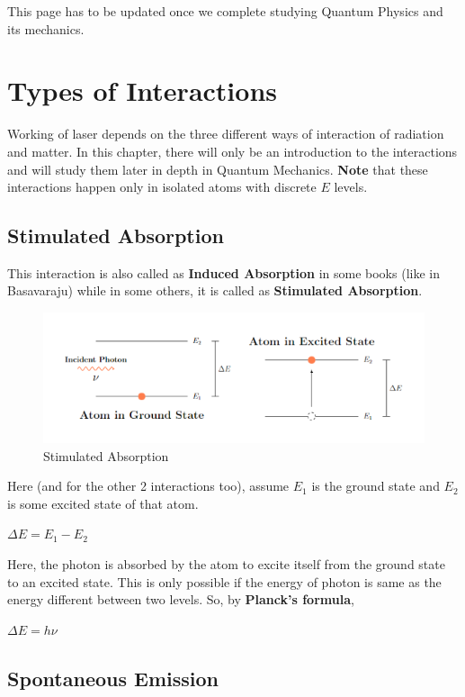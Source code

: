 \documentclass[12pt]{article}
\begin{document}
This page has to be updated once we complete studying Quantum Physics and its mechanics.

\section{Types of Interactions}

Working of laser depends on the three different ways of interaction of radiation and matter. In this chapter, there will only be an introduction to the interactions and will study them later in depth in Quantum Mechanics. \textbf{Note} that these interactions happen only in isolated atoms with discrete $E$ levels.

\subsection{Stimulated Absorption}

This interaction is also called as \textbf{Induced Absorption} in some books (like in Basavaraju) while in some others, it is called as \textbf{Stimulated Absorption}.

\begin{figure}[H]
    \centering
    \includegraphics[scale=0.5]{./img/03_induced_absorption.png}
    \caption{Stimulated Absorption}
\end{figure}

Here (and for the other 2 interactions too), assume $E_{1}$ is the ground state and $E_{2}$ is some excited state of that atom.

$\Delta E = E_{1} - E_{2}$ \vspace{.2cm}

Here, the photon is absorbed by the atom to excite itself from the ground state to an excited state. This is only possible if the energy of photon is same as the energy different between two levels. So, by \textbf{Planck's formula},

$\Delta E = h\nu$ 

\subsection{Spontaneous Emission}
\end{document}
